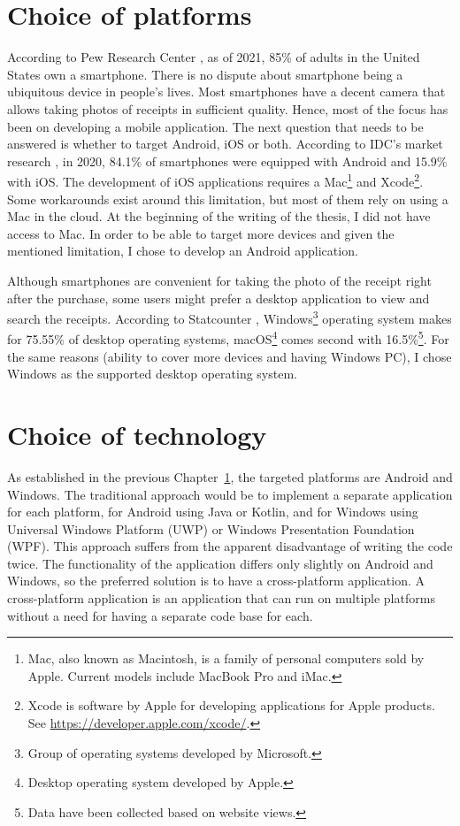 \documentclass[
  digital, %
  table,   %
  oneside, %
  lof,     %
  lot,     %
]{fithesis3}
\begin{document}
\chapter{Choice of platforms}
\label{chap:choice_of_platforms}
According to Pew Research Center \cite{PewResearchCenter2021Mobile}, as of 2021, 85\% of adults in the United States own a smartphone. There is no dispute about smartphone being a ubiquitous device in people's lives. 
Most smartphones have a decent camera that allows taking photos of receipts in sufficient quality. Hence, most of the focus has been on developing a mobile application.
The next question that needs to be answered is whether to target Android, iOS or both. According to IDC's market research \cite{Idc2021Smartphone}, in 2020, 84.1\% of smartphones were equipped with Android and 15.9\% with iOS. The development of iOS applications requires a Mac\footnote{Mac, also known as Macintosh, is a family of personal computers sold by Apple. Current models include MacBook Pro and iMac.} and Xcode\footnote{Xcode is software by Apple for developing applications for Apple products.\\See \url{https://developer.apple.com/xcode/}.}. Some workarounds exist around this limitation, but most of them rely on using a Mac in the cloud. At the beginning of the writing of the thesis, I did not have access to Mac. In order to be able to target more devices and given the mentioned limitation, I chose to develop an Android application.

Although smartphones are convenient for taking the photo of the receipt right after the purchase, some users might prefer a desktop application to view and search the receipts.
According to Statcounter \cite{Statcounter2021Desktop}, Windows\footnote{Group of operating systems developed by Microsoft.} operating system makes for 75.55\% of desktop operating systems, macOS\footnote{Desktop operating system developed by Apple.} comes second with 16.5\%\footnote{Data have been collected based on website views.}.
For the same reasons (ability to cover more devices and having Windows PC), I chose Windows as the supported desktop operating system.

\chapter{Choice of technology}
As established in the previous Chapter~\ref{chap:choice_of_platforms}, the targeted platforms are Android and Windows. The traditional approach would be to implement a separate application for each platform, for Android using Java or Kotlin, and for Windows using Universal Windows Platform (UWP) or Windows Presentation Foundation (WPF). This approach suffers from the apparent disadvantage of writing the code twice. The functionality of the application differs only slightly on Android and Windows, so the preferred solution is to have a cross-platform application. A cross-platform application is an application that can run on multiple platforms without a need for having a separate code base for each.
\end{document}
